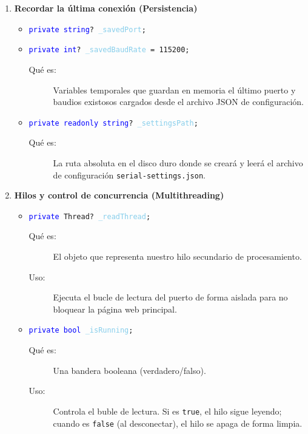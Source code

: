 \documentclass[
10pt, %
a4paper, %
oneside, %
headinclude,footinclude, %
BCOR5mm, %
]{scrartcl}
\begin{document}
\begin{enumerate}
\begin{itemize}
		\item \texttt{\textcolor{blue}{private int} \textcolor{SkyBlue}{\_currentBaudRate} =  \textcolor{Dandelion}{115200};}
		\begin{description}
			\item[Qué es:] La velocidad de comunicación activa del puerto (115200 bits por segundo por defecto).
		\end{description}
	\end{itemize}
	\item \textbf{Recordar la última conexión (Persistencia)}
	\begin{itemize}
		\item \texttt{\textcolor{blue}{private string}? \textcolor{SkyBlue}{\_savedPort};}
		\item \texttt{\textcolor{blue}{private int}? \textcolor{SkyBlue}{\_savedBaudRate} = \textcolor{Dandelion}{115200};}
		\begin{description}
			\item[Qué es:] Variables temporales que guardan en memoria el último puerto y baudios existosos cargados desde el archivo JSON de configuración.
		\end{description}
		
		\item \texttt{\textcolor{blue}{private readonly string}? \textcolor{SkyBlue}{\_settingsPath};}
		\begin{description}
			\item[Qué es:] La ruta absoluta en el disco duro donde se creará y leerá el archivo de configuración \texttt{serial-settings.json}.
		\end{description}
	\end{itemize} 
	\item \textbf{Hilos y control de concurrencia (Multithreading)}
	\begin{itemize}
		\item \texttt{\textcolor{blue}{private} \textcolor{Emerald}{Thread}? \textcolor{SkyBlue}{\_readThread};}
		\begin{description}
			\item[Qué es:] El objeto que representa nuestro hilo secundario de procesamiento.
			\item[Uso:] Ejecuta el bucle de lectura del puerto de forma aislada para no bloquear la página web principal.
		\end{description}
		
		\item \texttt{\textcolor{blue}{private bool} \textcolor{SkyBlue}{\_isRunning};}
		\begin{description}
			\item[Qué es:] Una bandera booleana (verdadero/falso).
			\item[Uso:] Controla el buble de lectura. Si es \texttt{true}, el hilo sigue leyendo; cuando es \texttt{false} (al desconectar), el hilo se apaga de forma limpia.
		\end{description}
		

\end{itemize}
\end{enumerate}
\end{document}
